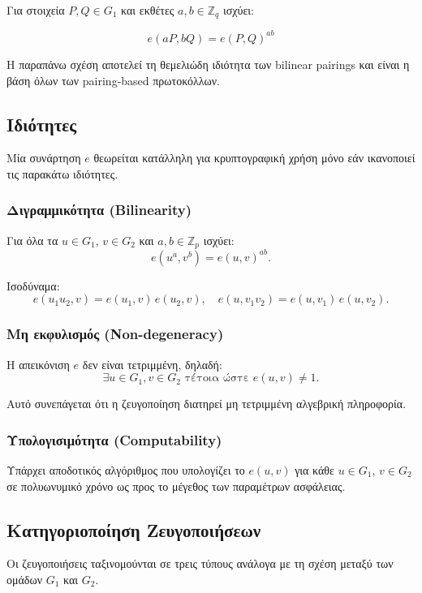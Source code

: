 \documentclass[12pt,a4paper]{report}
\begin{document}
Για στοιχεία \(P,Q \in G_1\) και εκθέτες
\(a,b \in \mathbb{Z}_q\) ισχύει:

\[
e(aP,bQ)=e(P,Q)^{ab}
\]

Η παραπάνω σχέση αποτελεί τη θεμελιώδη ιδιότητα
των bilinear pairings και είναι η βάση όλων των
pairing-based πρωτοκόλλων.

\subsection{Ιδιότητες}

Μία συνάρτηση \(e\) θεωρείται κατάλληλη για
κρυπτογραφική χρήση μόνο εάν ικανοποιεί τις
παρακάτω ιδιότητες.

\subsubsection*{Διγραμμικότητα (Bilinearity)}

Για όλα τα $u \in G_1$, $v \in G_2$ και $a,b \in \mathbb{Z}_p$ ισχύει:
\[
e(u^a, v^b) = e(u,v)^{ab}.
\]

Ισοδύναμα:
\[
e(u_1 u_2, v) = e(u_1, v)\, e(u_2, v), \quad
e(u, v_1 v_2) = e(u, v_1)\, e(u, v_2).
\]

\subsubsection*{Μη εκφυλισμός (Non-degeneracy)}

Η απεικόνιση $e$ δεν είναι τετριμμένη, δηλαδή:
\[
\exists u \in G_1, v \in G_2 \text{ τέτοια ώστε } e(u,v) \neq 1.
\]

Αυτό συνεπάγεται ότι η ζευγοποίηση διατηρεί μη τετριμμένη αλγεβρική πληροφορία.

\subsubsection*{Υπολογισιμότητα (Computability)}

Υπάρχει αποδοτικός αλγόριθμος που υπολογίζει το $e(u,v)$ για κάθε $u \in G_1$, $v \in G_2$ σε πολυωνυμικό χρόνο ως προς το μέγεθος των παραμέτρων ασφάλειας.

\subsection{Κατηγοριοποίηση Ζευγοποιήσεων}

Οι ζευγοποιήσεις ταξινομούνται σε τρεις τύπους ανάλογα με τη σχέση μεταξύ των ομάδων $G_1$ και $G_2$.
\end{document}
